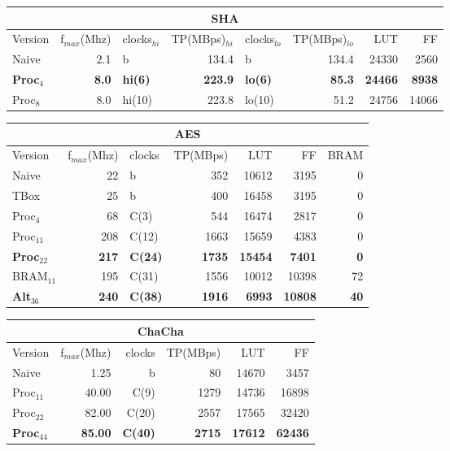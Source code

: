 \begin{frame}
\begin{minipage}[b]{0.65\textwidth}
\begin{tabular}{l r l r l r r r}
\end{tabular}
\begin{tabular}{l r l r l r r r}
\multicolumn{8}{c}{SHA}\\
\hline
Version & f$_{max}$(Mhz) & clocks$_{hi}$ & TP(MBps)$_{hi}$ &clocks$_{lo}$ & TP(MBps)$_{lo}$ & LUT & FF\\
\hline
Naive    & 2.1 & b & 134.4 & b &  134.4 & 24330 & 2560\\
\textbf{Proc}$_{4}$ & \textbf{8.0} & \textbf{hi(6)} &        \textbf{223.9} & \textbf{lo(6)} & \textbf{85.3} & \textbf{24466} & \textbf{8938}\\
Proc$_{8}$ & 8.0 & hi(10) &       223.8 & lo(10) & 51.2 & 24756 & 14066\\
\end{tabular}
\begin{tabular}{l r l r r r r}
\multicolumn{7}{c}{AES}\\
\hline
Version & f$_{max}$(Mhz) & clocks & TP(MBps) & LUT & FF & BRAM\\
\hline
Naive      &   22 & b          & 352    & 10612     &  3195 & 0\\
TBox       &  25 & b           & 400 & 16458 & 3195 & 0\\
Proc$_{4}$  &  68 & C(3) &        544 & 16474 & 2817 & 0\\
Proc$_{11}$ & 208 & C(12) &      1663 & 15659 & 4383 & 0\\
\textbf{Proc}$_{22}$ & \textbf{217} & \textbf{C(24)} &      \textbf{1735} & \textbf{15454} & \textbf{7401} & \textbf{0}\\
BRAM$_{11}$ & 195 & C(31)  &     1556 & 10012 & 10398 & 72\\
\textbf{Alt}$_{36}$ & \textbf{240} & \textbf{C(38)} &      \textbf{1916} & \textbf{6993} & \textbf{10808} & \textbf{40}
\end{tabular}
\begin{tabular}{l r r r r r}
\multicolumn{6}{c}{ChaCha}\\
\hline
Version & f$_{max}$(Mhz) & clocks & TP(MBps) & LUT & FF\\
\hline
Naive  & 1.25 & b & 80           & 14670 & 3457\\
Proc$_{11}$ & 40.00 & C(9) & 1279 &  14736 & 16898\\
Proc$_{22}$ & 82.00 & C(20) & 2557 &  17565 & 32420\\
\textbf{Proc}$_{44}$ & \textbf{85.00} & \textbf{C(40)} & \textbf{2715} & \textbf{17612} & \textbf{62436}\\
\end{tabular}
\end{minipage}
\end{frame}

